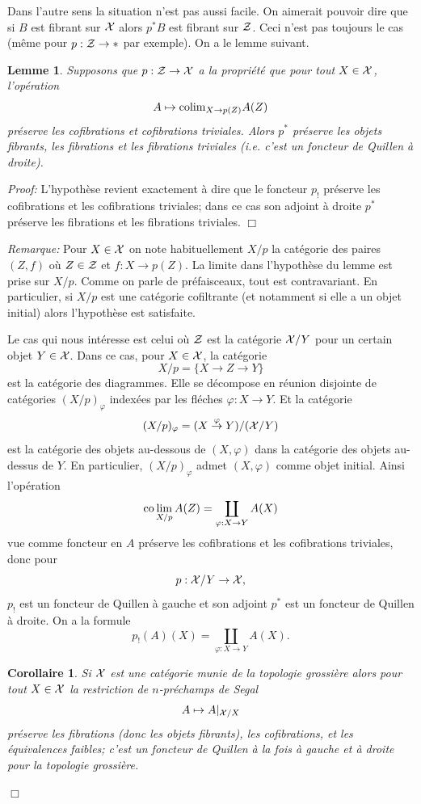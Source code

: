 \documentclass[12pt]{article}
\newcommand{\eop}{\hfill $\Box$\vspace{.1in}}
\newtheorem{lemme}[lemma]{Lemme}
\newtheorem{corollaire}[lemma]{Corollaire}
\newcommand{\Xx}{{\cal X}}
\newcommand{\Zz}{{\cal Z}}
\begin{document}
Dans l'autre sens la situation n'est pas aussi facile. On aimerait pouvoir dire
que si $B$ est fibrant sur $\Xx$ alors $p^{\ast}B$
est fibrant sur $\Zz$. Ceci n'est
pas toujours le cas (m\^eme pour $p: \Zz \rightarrow \ast$ par exemple).
On a le lemme suivant.

\begin{lemme}
\label{shriek}
Supposons que $p: \Zz \rightarrow \Xx$ a la propri\'et\'e que pour tout $X\in
\Xx$, l'op\'eration
$$
A\mapsto {\rm colim}_{ X\rightarrow p(Z)}A(Z)
$$
pr\'eserve les cofibrations et cofibrations triviales. Alors
$p^{\ast}$
pr\'eserve
les objets fibrants, les fibrations et les fibrations triviales (i.e. c'est
un foncteur
de Quillen \`a droite).
\end{lemme}
{\em Proof:}
L'hypoth\`ese revient exactement \`a dire que le foncteur $p_!$
pr\'eserve les
cofibrations et les cofibrations triviales; dans ce cas son adjoint \`a droite
$p^{\ast}$ pr\'eserve les fibrations et les fibrations triviales.
\eop

{\em Remarque:} Pour $X\in \Xx$ on note habituellement $X/p$ la cat\'egorie
des paires  $(Z,f)$ o\`u $Z\in \Zz$ et $f: X\rightarrow p(Z)$. La limite
dans l'hypoth\`ese du lemme est prise sur $X/p$. Comme on parle de
pr\'efaisceaux, tout est contravariant. En particulier, si $X/p$  est une
cat\'egorie cofiltrante (et notamment si elle a un objet initial) alors
l'hypoth\`ese est satisfaite.

Le cas qui nous int\'eresse est celui o\`u
$\Zz$ est la cat\'egorie $\Xx /Y$ pour un certain objet  $Y\in \Xx$.
Dans ce cas, pour $X\in \Xx$, la cat\'egorie
$$
X/p = \{  X\rightarrow Z \rightarrow Y\}
$$
est la cat\'egorie des diagrammes. Elle se d\'ecompose en r\'eunion disjointe
de cat\'egories $(X/p)_{\varphi}$ index\'ees par les fl\'eches $\varphi :
X\rightarrow Y$. Et la cat\'egorie
$$
(X/p)_{\varphi} = (X\stackrel{\varphi}{\rightarrow} Y) / (\Xx / Y)
$$
est la cat\'egorie des objets au-dessous de $(X,\varphi )$ dans la cat\'egorie
des objets au-dessus de $Y$. En particulier, $(X/p)_{\varphi}$ admet
$(X,\varphi )$ comme objet initial. Ainsi l'op\'eration
$$
{\rm co}\lim _{X/p} A(Z) = \coprod _{\varphi : X\rightarrow Y} A(X)
$$
vue comme foncteur en $A$
pr\'eserve les cofibrations et les cofibrations triviales,
donc pour
$$
p: \Xx /Y\rightarrow \Xx ,
$$
$p_!$ est un foncteur de Quillen \`a gauche et son adjoint $p^{\ast}$ est un
foncteur de Quillen \`a droite. On a la formule
$$
p_!(A) (X) = \coprod _{\varphi : X\rightarrow Y} A(X).
$$

\begin{corollaire}
\label{fibrestrict}
Si $\Xx$ est une cat\'egorie munie de la topologie grossi\`ere alors pour
tout $X\in
\Xx$ la restriction de $n$-pr\'echamps de Segal
$$
A\mapsto A|_{\Xx /X}
$$
pr\'eserve les fibrations (donc les objets fibrants), les
cofibrations, et les
\'equivalences faibles; c'est un foncteur de Quillen \`a
la fois \`a gauche et
\`a droite pour la topologie grossi\`ere.
\end{corollaire}
\eop
\end{document}

